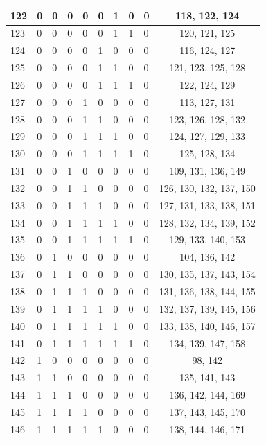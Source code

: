 \begin{longtable}{|l|l|l|l|l|l|l|l|l|c|}
122 & 0 & 0 & 0 & 0 & 0 & 1 & 0 & 0 & 118, 122, 124 \\ \hline
123 & 0 & 0 & 0 & 0 & 0 & 1 & 1 & 0 & 120, 121, 125 \\ \hline
124 & 0 & 0 & 0 & 0 & 1 & 0 & 0 & 0 & 116, 124, 127 \\ \hline
125 & 0 & 0 & 0 & 0 & 1 & 1 & 0 & 0 & 121, 123, 125, 128 \\ \hline
126 & 0 & 0 & 0 & 0 & 1 & 1 & 1 & 0 & 122, 124, 129 \\ \hline
127 & 0 & 0 & 0 & 1 & 0 & 0 & 0 & 0 & 113, 127, 131 \\ \hline
128 & 0 & 0 & 0 & 1 & 1 & 0 & 0 & 0 & 123, 126, 128, 132 \\ \hline
129 & 0 & 0 & 0 & 1 & 1 & 1 & 0 & 0 & 124, 127, 129, 133 \\ \hline
130 & 0 & 0 & 0 & 1 & 1 & 1 & 1 & 0 & 125, 128, 134 \\ \hline
131 & 0 & 0 & 1 & 0 & 0 & 0 & 0 & 0 & 109, 131, 136, 149 \\ \hline
132 & 0 & 0 & 1 & 1 & 0 & 0 & 0 & 0 & 126, 130, 132, 137, 150 \\ \hline
133 & 0 & 0 & 1 & 1 & 1 & 0 & 0 & 0 & 127, 131, 133, 138, 151 \\ \hline
134 & 0 & 0 & 1 & 1 & 1 & 1 & 0 & 0 & 128, 132, 134, 139, 152 \\ \hline
135 & 0 & 0 & 1 & 1 & 1 & 1 & 1 & 0 & 129, 133, 140, 153 \\ \hline
136 & 0 & 1 & 0 & 0 & 0 & 0 & 0 & 0 & 104, 136, 142 \\ \hline
137 & 0 & 1 & 1 & 0 & 0 & 0 & 0 & 0 & 130, 135, 137, 143, 154 \\ \hline
138 & 0 & 1 & 1 & 1 & 0 & 0 & 0 & 0 & 131, 136, 138, 144, 155 \\ \hline
139 & 0 & 1 & 1 & 1 & 1 & 0 & 0 & 0 & 132, 137, 139, 145, 156 \\ \hline
140 & 0 & 1 & 1 & 1 & 1 & 1 & 0 & 0 & 133, 138, 140, 146, 157 \\ \hline
141 & 0 & 1 & 1 & 1 & 1 & 1 & 1 & 0 & 134, 139, 147, 158 \\ \hline
142 & 1 & 0 & 0 & 0 & 0 & 0 & 0 & 0 & 98, 142 \\ \hline
143 & 1 & 1 & 0 & 0 & 0 & 0 & 0 & 0 & 135, 141, 143 \\ \hline
144 & 1 & 1 & 1 & 0 & 0 & 0 & 0 & 0 & 136, 142, 144, 169 \\ \hline
145 & 1 & 1 & 1 & 1 & 0 & 0 & 0 & 0 & 137, 143, 145, 170 \\ \hline
146 & 1 & 1 & 1 & 1 & 1 & 0 & 0 & 0 & 138, 144, 146, 171 \\ \hline

\end{longtable}
